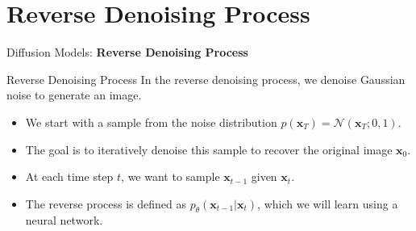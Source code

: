 \section{Reverse Denoising Process}
\begin{frame}{}
    \LARGE Diffusion Models: \textbf{Reverse Denoising Process}
\end{frame}

\begin{frame}{Reverse Denoising Process}
    In the reverse denoising process, we denoise Gaussian noise to generate an image.
    \begin{itemize}
        \item<2-> We start with a sample from the noise distribution $p(\mathbf{x}_T) = \mathcal{N}(\mathbf{x}_T; 0, 1)$.
        \item<3-> The goal is to iteratively denoise this sample to recover the original image $\mathbf{x}_0$.
        \item<4-> At each time step $t$, we want to sample $\mathbf{x}_{t-1}$ given $\mathbf{x}_t$.
        \item<5-> The reverse process is defined as $p_\theta(\mathbf{x}_{t-1}|\mathbf{x}_t)$, which we will learn using a neural network.
    \end{itemize}
\end{frame}


